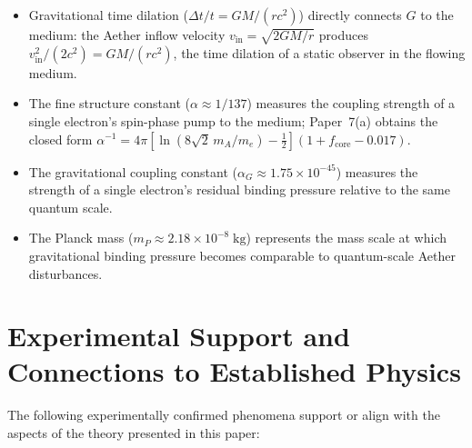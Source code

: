 ﻿\documentclass[12pt,letterpaper]{article}
\newcommand{\vin}{v_{\mathrm{in}}}
\begin{document}
\begin{itemize}[leftmargin=2em]
  \item Gravitational time dilation ($\Delta t/t = GM/(rc^2)$) directly connects $G$ to the
    medium: the Aether inflow velocity $\vin = \sqrt{2GM/r}$ produces
    $\vin^2/(2c^2) = GM/(rc^2)$, the time dilation of a static observer in the
    flowing medium.
  \item The fine structure constant ($\alpha \approx 1/137$) measures the coupling
    strength of a single electron's spin-phase pump to the medium; Paper~7(a)
    \cite{otto-boundcore} obtains the closed form
    $\alpha^{-1} = 4\pi[\ln(8\sqrt{2}\,m_A/m_e) - \tfrac12](1 + f_{\mathrm{core}} - 0.017)$.
  \item The gravitational coupling constant ($\alpha_G \approx 1.75 \times 10^{-45}$)
    measures the strength of a single electron's residual binding pressure relative to
    the same quantum scale.
  \item The Planck mass ($m_P \approx 2.18 \times 10^{-8}\;\mathrm{kg}$) represents the mass scale
    at which gravitational binding pressure becomes comparable to quantum-scale Aether
    disturbances.
\end{itemize}



\section{Experimental Support and Connections to Established Physics}

The following experimentally confirmed phenomena support or align with the aspects of the theory presented in this paper:
\end{document}
